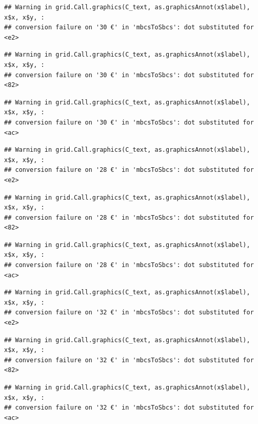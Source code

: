 \documentclass[
]{article}
\begin{document}
\begin{verbatim}
## Warning in grid.Call.graphics(C_text, as.graphicsAnnot(x$label), x$x, x$y, :
## conversion failure on '30 €' in 'mbcsToSbcs': dot substituted for <e2>
\end{verbatim}

\begin{verbatim}
## Warning in grid.Call.graphics(C_text, as.graphicsAnnot(x$label), x$x, x$y, :
## conversion failure on '30 €' in 'mbcsToSbcs': dot substituted for <82>
\end{verbatim}

\begin{verbatim}
## Warning in grid.Call.graphics(C_text, as.graphicsAnnot(x$label), x$x, x$y, :
## conversion failure on '30 €' in 'mbcsToSbcs': dot substituted for <ac>
\end{verbatim}

\begin{verbatim}
## Warning in grid.Call.graphics(C_text, as.graphicsAnnot(x$label), x$x, x$y, :
## conversion failure on '28 €' in 'mbcsToSbcs': dot substituted for <e2>
\end{verbatim}

\begin{verbatim}
## Warning in grid.Call.graphics(C_text, as.graphicsAnnot(x$label), x$x, x$y, :
## conversion failure on '28 €' in 'mbcsToSbcs': dot substituted for <82>
\end{verbatim}

\begin{verbatim}
## Warning in grid.Call.graphics(C_text, as.graphicsAnnot(x$label), x$x, x$y, :
## conversion failure on '28 €' in 'mbcsToSbcs': dot substituted for <ac>
\end{verbatim}

\begin{verbatim}
## Warning in grid.Call.graphics(C_text, as.graphicsAnnot(x$label), x$x, x$y, :
## conversion failure on '32 €' in 'mbcsToSbcs': dot substituted for <e2>
\end{verbatim}

\begin{verbatim}
## Warning in grid.Call.graphics(C_text, as.graphicsAnnot(x$label), x$x, x$y, :
## conversion failure on '32 €' in 'mbcsToSbcs': dot substituted for <82>
\end{verbatim}

\begin{verbatim}
## Warning in grid.Call.graphics(C_text, as.graphicsAnnot(x$label), x$x, x$y, :
## conversion failure on '32 €' in 'mbcsToSbcs': dot substituted for <ac>
\end{verbatim}
\end{document}
